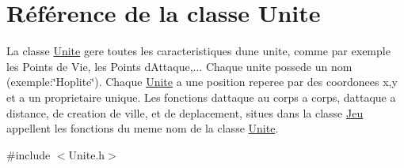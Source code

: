 \hypertarget{classUnite}{}\section{Référence de la classe Unite}
\label{classUnite}


La classe \hyperlink{classUnite}{Unite} gere toutes les caracteristiques d\textquotesingle{}une unite, comme par exemple les Points de Vie, les Points d\textquotesingle{}Attaque,... Chaque unite possede un nom (exemple\+:\char`\"{}\+Hoplite\char`\"{}). Chaque \hyperlink{classUnite}{Unite} a une position reperee par des coordonees x,y et a un proprietaire unique. Les fonctions d\textquotesingle{}attaque au corps a corps, d\textquotesingle{}attaque a distance, de creation de ville, et de deplacement, situes dans la classe \hyperlink{classJeu}{Jeu} appellent les fonctions du meme nom de la classe \hyperlink{classUnite}{Unite}.  




{\ttfamily \#include $<$Unite.\+h$>$}

